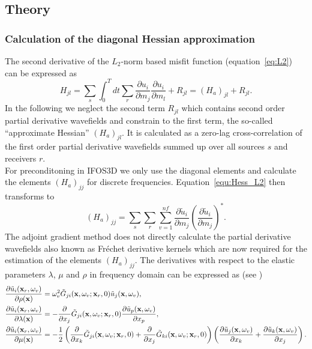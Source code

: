 \subsection{Theory}
\subsubsection*{Calculation of the diagonal Hessian approximation}
The second derivative of the $L_2$-norm based misfit function (equation~\ref{eq:L2}) can be expressed as   \begin{equation}H_{jl}=\sum_{s}\int_0^T dt \sum_{r}\frac{\partial u_i}{\partial m_j}\frac{\partial u_i}{\partial m_l}+R_{jl} =(H_a)_{jl}+R_{jl}.\label{equ:Hess_L2}\end{equation}
In the following we neglect the second term $R_{jl}$ which contains second order partial derivative wavefields and constrain to the first term, the so-called ``approximate Hessian'' $(H_a)_{jl}$. It is calculated as a zero-lag cross-correlation of the first order partial derivative wavefields summed up over all sources $s$ and receivers $r$.\\
For preconditoning in IFOS3D we only use the diagonal elements and calculate the elements $(H_a)_{jj}$ for discrete frequencies. Equation~\ref{equ:Hess_L2} then transforms to \citep{But15}
\begin{equation}(H_a)_{jj}=\sum_{s}\sum_{r}\sum_{v=1}^{nf}\frac{\partial\tilde u_i}{\partial m_j}\left(\frac{\partial\tilde u_i}{\partial m_j}\right )^*. \label{Hess_diag}\end{equation}
The adjoint gradient method does not directly calculate the partial derivative wavefields also known as Fr\'echet derivative kernels which are now required for the estimation of the elements $(H_a)_{jj}$. The derivatives with respect to the elastic parameters $\lambda$, $\mu$ and $\rho$ in frequency domain can be expressed as (see \cite{But15})
\begin{equation}
\begin{split}
 \frac{\partial \tilde u_i(\textbf x_r,\omega_v)}{\partial\rho(\textbf x)} & =\omega_v^2\tilde G_{ji}(\textbf x,\omega_v;\textbf x_r,0)\tilde u_j(\textbf x,\omega_v),\\
\frac{\partial\tilde u_i(\textbf x_r,\omega_v)}{\partial\lambda(\textbf x)} & =-\frac{\partial}{\partial x_j}\tilde G_{ji}(\textbf x,\omega_v;\textbf x_r,0)\frac{\partial\tilde u_p(\textbf x,\omega_v)}{\partial x_p},\\
\frac{\partial\tilde u_i(\textbf x_r,\omega_v)}{\partial\mu(\textbf x)} & =-\frac{1}{2}\left (\frac{\partial}{\partial x_k}\tilde G_{ji}(\textbf x,\omega_v;\textbf x_r,0)+\frac{\partial}{\partial x_j}\tilde G_{ki}(\textbf x,\omega_v;\textbf x_r,0)\right )\left (\frac{\partial\tilde u_j(\textbf x,\omega_v)}{\partial x_k}+\frac{\partial\tilde u_k(\textbf x,\omega_v)}{\partial x_j}\right ).
\end{split}\label{equ:frechet4}
\end{equation}
